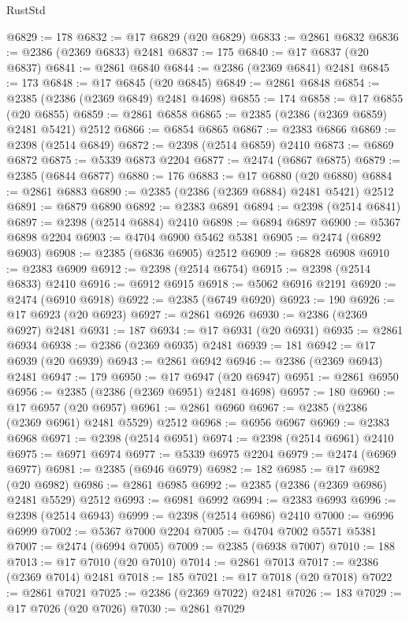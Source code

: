 \begin{lexlean}{RustStd}
\begin{coremodule}
@6829 := 178
@6832 := @17 @6829 (@20 @6829)
@6833 := @2861 @6832
@6836 := @2386 (@2369 @6833) @2481
@6837 := 175
@6840 := @17 @6837 (@20 @6837)
@6841 := @2861 @6840
@6844 := @2386 (@2369 @6841) @2481
@6845 := 173
@6848 := @17 @6845 (@20 @6845)
@6849 := @2861 @6848
@6854 := @2385 (@2386 (@2369 @6849) @2481 @4698)
@6855 := 174
@6858 := @17 @6855 (@20 @6855)
@6859 := @2861 @6858
@6865 := @2385 (@2386 (@2369 @6859) @2481 @5421) @2512
@6866 := @6854 @6865
@6867 := @2383 @6866
@6869 := @2398 (@2514 @6849)
@6872 := @2398 (@2514 @6859) @2410
@6873 := @6869 @6872
@6875 := @5339 @6873 @2204
@6877 := @2474 (@6867 @6875)
@6879 := @2385 (@6844 @6877)
@6880 := 176
@6883 := @17 @6880 (@20 @6880)
@6884 := @2861 @6883
@6890 := @2385 (@2386 (@2369 @6884) @2481 @5421) @2512
@6891 := @6879 @6890
@6892 := @2383 @6891
@6894 := @2398 (@2514 @6841)
@6897 := @2398 (@2514 @6884) @2410
@6898 := @6894 @6897
@6900 := @5367 @6898 @2204
@6903 := @4704 @6900 @5462 @5381
@6905 := @2474 (@6892 @6903)
@6908 := @2385 (@6836 @6905) @2512
@6909 := @6828 @6908
@6910 := @2383 @6909
@6912 := @2398 (@2514 @6754)
@6915 := @2398 (@2514 @6833) @2410
@6916 := @6912 @6915
@6918 := @5062 @6916 @2191
@6920 := @2474 (@6910 @6918)
@6922 := @2385 (@6749 @6920)
@6923 := 190
@6926 := @17 @6923 (@20 @6923)
@6927 := @2861 @6926
@6930 := @2386 (@2369 @6927) @2481
@6931 := 187
@6934 := @17 @6931 (@20 @6931)
@6935 := @2861 @6934
@6938 := @2386 (@2369 @6935) @2481
@6939 := 181
@6942 := @17 @6939 (@20 @6939)
@6943 := @2861 @6942
@6946 := @2386 (@2369 @6943) @2481
@6947 := 179
@6950 := @17 @6947 (@20 @6947)
@6951 := @2861 @6950
@6956 := @2385 (@2386 (@2369 @6951) @2481 @4698)
@6957 := 180
@6960 := @17 @6957 (@20 @6957)
@6961 := @2861 @6960
@6967 := @2385 (@2386 (@2369 @6961) @2481 @5529) @2512
@6968 := @6956 @6967
@6969 := @2383 @6968
@6971 := @2398 (@2514 @6951)
@6974 := @2398 (@2514 @6961) @2410
@6975 := @6971 @6974
@6977 := @5339 @6975 @2204
@6979 := @2474 (@6969 @6977)
@6981 := @2385 (@6946 @6979)
@6982 := 182
@6985 := @17 @6982 (@20 @6982)
@6986 := @2861 @6985
@6992 := @2385 (@2386 (@2369 @6986) @2481 @5529) @2512
@6993 := @6981 @6992
@6994 := @2383 @6993
@6996 := @2398 (@2514 @6943)
@6999 := @2398 (@2514 @6986) @2410
@7000 := @6996 @6999
@7002 := @5367 @7000 @2204
@7005 := @4704 @7002 @5571 @5381
@7007 := @2474 (@6994 @7005)
@7009 := @2385 (@6938 @7007)
@7010 := 188
@7013 := @17 @7010 (@20 @7010)
@7014 := @2861 @7013
@7017 := @2386 (@2369 @7014) @2481
@7018 := 185
@7021 := @17 @7018 (@20 @7018)
@7022 := @2861 @7021
@7025 := @2386 (@2369 @7022) @2481
@7026 := 183
@7029 := @17 @7026 (@20 @7026)
@7030 := @2861 @7029

\end{coremodule}
\end{lexlean}
